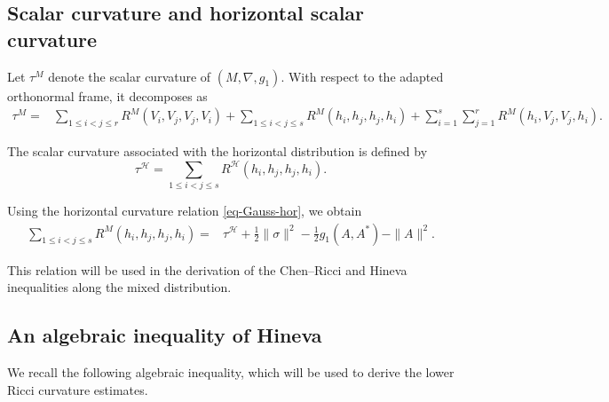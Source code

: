 \documentclass[10pt,a4paper]{article}
\theoremstyle{definition}
\theoremstyle{remark}
\numberwithin{equation}{section}
\begin{document}
\subsection{Scalar curvature and horizontal scalar curvature}

Let $\tau^{M}$ denote the scalar curvature of $(M,\nabla,g_1)$. With
respect to the adapted orthonormal frame, it decomposes as
\begin{equation}
\begin{aligned}
\tau^{M}
={}&
\sum_{1\leq i<j\leq r}
R^{M}(V_i,V_j,V_j,V_i)+
\sum_{1\leq i<j\leq s}
R^{M}(h_i,h_j,h_j,h_i)+
\sum_{i=1}^{s}\sum_{j=1}^{r}
R^{M}(h_i,V_j,V_j,h_i).
&
\end{aligned}
\label{eq-scalar-curvature}
\end{equation}

The scalar curvature associated with the horizontal distribution is
defined by
\begin{equation}
\tau^{\mathcal H}
=
\sum_{1\leq i<j\leq s}
R^{\mathcal H}(h_i,h_j,h_j,h_i).
\label{eq-horizontal-scalar}
\end{equation}

Using the horizontal curvature relation
\eqref{eq-Gauss-hor}, we obtain
\begin{equation}
\begin{aligned}
\sum_{1\leq i<j\leq s}
R^{M}(h_i,h_j,h_j,h_i)
={}&
\tau^{\mathcal H}
+\frac12\|\sigma\|^{2}
-\frac12g_1(A,A^{*})
-\|A\|^{2}.
\end{aligned}
\label{eq-horizontal-scalar-relation}
\end{equation}

This relation will be used in the derivation of the Chen--Ricci and
Hineva inequalities along the mixed distribution.

\subsection{An algebraic inequality of Hineva}

We recall the following algebraic inequality, which will be used to
derive the lower Ricci curvature estimates.
\end{document}
